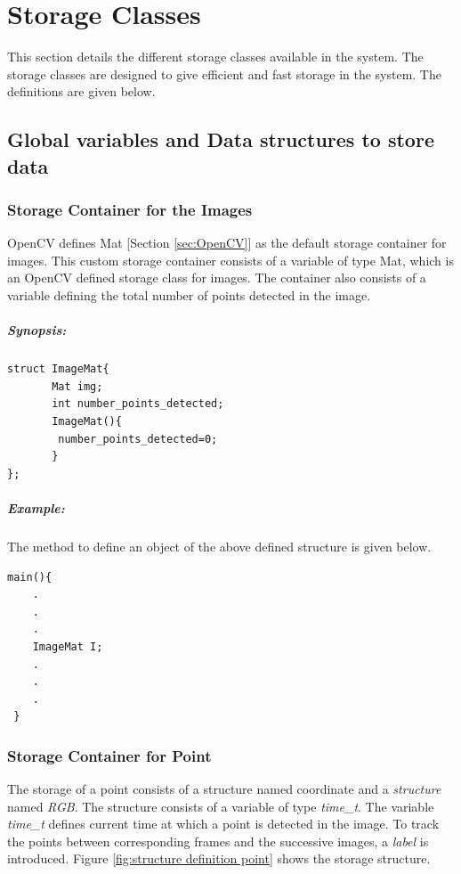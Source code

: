 
\chapter{Storage Classes}
\label{chap:Storage}
This section details the different storage classes available in the system. The storage classes are designed to give efficient and fast storage in the system. The definitions are given below.
\section {Global variables and Data structures to store data }
\label{sec:Global Variables and structure data types}  
\subsection{ Storage Container for the Images}
\label{subsubsec:Datatypes} 
OpenCV defines Mat [Section \ref{sec:OpenCV}] as the default storage container for images. This custom storage container consists of a variable of type Mat, which is an OpenCV defined storage class for images. The container also consists of a variable defining the total number of points detected in the image.
\paragraph{Synopsis:}
\begin{lstlisting}
struct ImageMat{
       Mat img;
       int number_points_detected;
       ImageMat(){
        number_points_detected=0;
       }
};
\end{lstlisting}
\pagebreak
\paragraph{Example:} The method to define an object of the above defined structure is given below.
\begin{lstlisting}
main(){
    .
    .
    .
    ImageMat I;
    .
    .
    .
 }
\end{lstlisting}
\subsection{Storage Container for Point}
The storage of a point consists of a structure named coordinate and a \textit{structure} named \textit{RGB}. The structure consists of a variable of type \textit{time\_t}. The variable \textit{time\_t} defines current time at which a point is detected in the image. To track the points between corresponding frames and the successive images, a \textit{label} is introduced. Figure \ref{fig:structure definition point} shows the storage structure.
